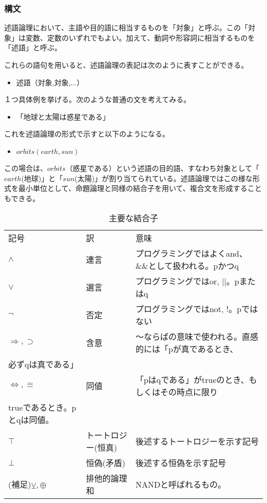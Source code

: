 \documentclass[dvipdfmx]{jsarticle}
\begin{document}
  \subsubsection{構文}
  述語論理において、主語や目的語に相当するものを「対象」と呼ぶ。この「対象」は変数、定数のいずれでもよい。加えて、動詞や形容詞に相当するものを「述語」と呼ぶ。\par
  これらの語句を用いると、述語論理の表記は次のように表すことができる。
  \begin{itemize}
    \item 述語（対象,対象,...）
  \end{itemize}
  １つ具体例を挙げる。次のような普通の文を考えてみる。
  \begin{itemize}
    \item 「地球と太陽は惑星である」
  \end{itemize}
  これを述語論理の形式で示すと以下のようになる。
  \begin{itemize}
    \item $orbits(earth, sun)$
  \end{itemize}
  この場合は、$orbits$（惑星である）という述語の目的語、すなわち対象として「$earth$(地球)」と「$sun$(太陽)」が割り当てられている。述語論理ではこの様な形式を最小単位として、命題論理と同様の結合子を用いて、複合文を形成することもできる。
  \begin{screen}
  \begin{table}[H]
    \centering
    \begin{tabular}{lll}
    記号                & 訳 & 意味\\
    $\wedge$          & 連言 & プログラミングではよくand、\&\&として扱われる。pかつq\\
    $\vee$            & 選言 & プログラミングではor, ||。pまたはq\\
    $\neg$            & 否定 & プログラミングではnot, !。pではない\\
    $\Rightarrow, \supset$     & 含意 &〜ならばの意味で使われる。直感的には「pが真であるとき、\\
    必ずqは真である」\\
    $\Leftrightarrow, \equiv$ & 同値 &「pはqである」がtrueのとき、もしくはその時点に限り\\
    trueであるとき。pとqは同値。\\
    $\top$ &トートロジー(恒真)&後述するトートロジーを示す記号 \\
    $\bot$ &恒偽(矛盾)&後述する恒偽を示す記号\\
    (補足)$\veebar, \oplus$ & 排他的論理和& NANDと呼ばれるもの。\\
    \end{tabular}
    \caption{主要な結合子}
\end{table}
\end{screen}
\end{document}
